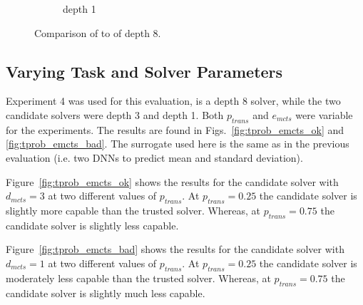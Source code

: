 \begin{figure}[tbp]
\begin{subfigure}[b]{0.48\linewidth}
        \caption{\solve{} depth 1}
        \label{fig:tprob_bad}
    \end{subfigure} 
    \caption{Comparison of \solve{} to \solvestar{} of depth 8.}
\end{figure}

\subsection{Varying Task and Solver Parameters}
Experiment 4 was used for this evaluation, \solvestar{} is a depth 8 solver, while the two candidate solvers were depth 3 and depth 1. Both $p_{trans}$ and $e_{mcts}$ were variable for the experiments. The results are found in Figs.~\ref{fig:tprob_emcts_ok} and \ref{fig:tprob_emcts_bad}. The surrogate \surrogate{} used here is the same as in the previous evaluation (i.e. two DNNs to predict mean and standard deviation).

Figure~\ref{fig:tprob_emcts_ok} shows the results for the candidate solver with $d_{mcts}=3$ at two different values of $p_{trans}$. At $p_{trans}=0.25$ the candidate solver is slightly more capable than the trusted solver. Whereas, at $p_{trans}=0.75$ the candidate solver is slightly less capable.

Figure~\ref{fig:tprob_emcts_bad} shows the results for the candidate solver with $d_{mcts}=1$ at two different values of $p_{trans}$. At $p_{trans}=0.25$ the candidate solver is moderately less capable than the trusted solver. Whereas, at $p_{trans}=0.75$ the candidate solver is slightly much less capable.

